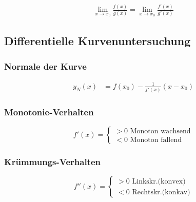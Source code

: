\begin{align*} 
 \lim_{x \to x_0}\frac{f(x)}{g(x)}=\lim_{x \to x_0}\frac{f'(x)}{g'(x)}
\end{align*}

\subsection{Differentielle Kurvenuntersuchung}


\subsubsection*{Normale der Kurve}

\begin{align*} 
y_N(x)&=f(x_0)-\frac{1}{f'(x)}\left(x-x_0\right)
\end{align*}

\begin{multicols}{2}
\subsubsection*{Monotonie-Verhalten}
\[f'(x)=
\begin{cases}
>0\text{ Monoton wachsend}\\
<0\text{ Monoton fallend}
\end{cases}\]
\vfill
\subsubsection*{Krümmungs-Verhalten}
\[ 
f''(x)=
\begin{cases}
>0\text{ Linkskr.(konvex)}\\ 
<0\text{ Rechtskr.(konkav)}
\end{cases}\]
\end{multicols}

